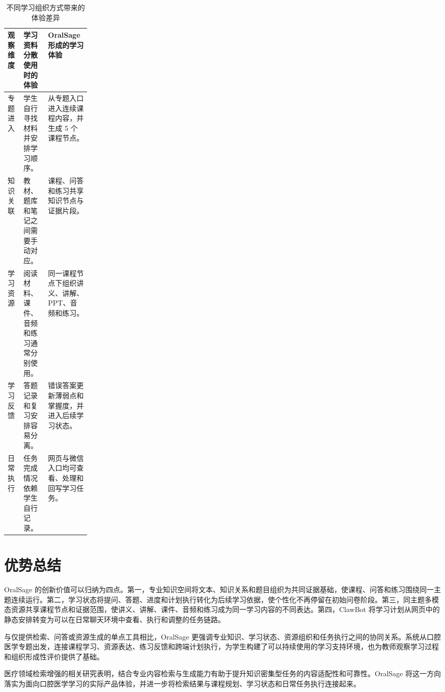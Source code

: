 \begin{table}[H]
  \centering
  \caption{不同学习组织方式带来的体验差异}
  \label{tab:innovation-experience-comparison}
  \begin{tabularx}{\linewidth}{p{0.19\linewidth}X X}
    \toprule
    观察维度 & 学习资料分散使用时的体验 & OralSage 形成的学习体验 \\
    \midrule
    专题进入 & 学生自行寻找材料并安排学习顺序。 & 从专题入口进入连续课程内容，并生成 5 个课程节点。 \\
    知识关联 & 教材、题库和笔记之间需要手动对应。 & 课程、问答和练习共享知识节点与证据片段。 \\
    学习资源 & 阅读材料、课件、音频和练习通常分别使用。 & 同一课程节点下组织讲义、讲解、PPT、音频和练习。 \\
    学习反馈 & 答题记录和复习安排容易分离。 & 错误答案更新薄弱点和掌握度，并进入后续学习状态。 \\
    日常执行 & 任务完成情况依赖学生自行记录。 & 网页与微信入口均可查看、处理和回写学习任务。 \\
    \bottomrule
  \end{tabularx}
\end{table}

\section{优势总结}

OralSage 的创新价值可以归纳为四点。第一，专业知识空间将文本、知识关系和题目组织为共同证据基础，使课程、问答和练习围绕同一主题连续运行。第二，学习状态将提问、答题、进度和计划执行转化为后续学习依据，使个性化不再停留在初始问卷阶段。第三，同主题多模态资源共享课程节点和证据范围，使讲义、讲解、课件、音频和练习成为同一学习内容的不同表达。第四，ClawBot 将学习计划从网页中的静态安排转变为可以在日常聊天环境中查看、执行和调整的任务链路。

与仅提供检索、问答或资源生成的单点工具相比，OralSage 更强调专业知识、学习状态、资源组织和任务执行之间的协同关系。系统从口腔医学专题出发，连接课程学习、资源表达、练习反馈和跨端计划执行，为学生构建了可以持续使用的学习支持环境，也为教师观察学习过程和组织形成性评价提供了基础。

医疗领域检索增强的相关研究表明，结合专业内容检索与生成能力有助于提升知识密集型任务的内容适配性和可靠性\cite{collaco2026ft_rag}。OralSage 将这一方向落实为面向口腔医学学习的实际产品体验，并进一步将检索结果与课程规划、学习状态和日常任务执行连接起来。

